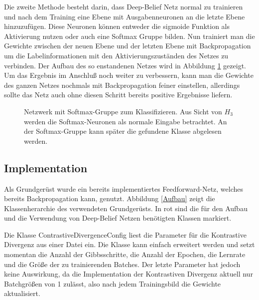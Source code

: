 \documentclass[12pt]{article}
\begin{document}
Die zweite Methode besteht darin, dass Deep-Belief Netz normal zu trainieren und nach dem Training eine Ebene mit Ausgabenneuronen an die letzte Ebene hinzuzufügen. Diese Neuronen können entweder die sigmoide Funktion als Aktivierung nutzen oder auch eine Softmax Gruppe bilden. Nun trainiert man die Gewichte zwischen der neuen Ebene und der letzten Ebene mit Backpropagation um die Labelinformationen mit den Aktivierungszuständen des Netzes zu verbinden. Der Aufbau des so enstandenen Netzes wird in Abbildung \ref{BPTrain} gezeigt. Um das Ergebnis im Anschluß noch weiter zu verbessern, kann man die Gewichte des ganzen Netzes nochmals mit Backpropagation feiner einstellen, allerdings sollte das Netz auch ohne diesen Schritt bereits positive Ergebnisse liefern\cite{backprop}.

\begin{figure}[H]
	\center
	
	\caption{Netzwerk mit Softmax-Gruppe zum Klassifizieren. Aus Sicht von $H_3$ werden die Softmax-Neuronen als normale Eingabe betrachtet. An der Softmax-Gruppe kann später die gefundene Klasse abgelesen werden.}
	\label{BPTrain}
\end{figure}


\subsection{Implementation}
Als Grundgerüst wurde ein bereits implementiertes Feedforward-Netz, welches bereits Backpropagation kann, genutzt. Abbildung \ref{Aufbau} zeigt die Klassenherarchie des verwendeten Grundgerüsts. In rot sind die für den Aufbau und die Verwendung von Deep-Belief Netzen benötigten Klassen markiert.

Die Klasse ContrastiveDivergenceConfig liest die Parameter für die Kontrastive Divergenz aus einer Datei ein. Die Klasse kann einfach erweitert werden und setzt momentan die Anzahl der Gibbsschritte, die Anzahl der Epochen, die Lernrate und die Größe der zu trainierenden Batches. Der letzte Parameter hat jedoch keine Auswirkung, da die Implementation der Kontrastiven Divergenz aktuell nur Batchgrößen von 1 zulässt, also nach jedem Trainingsbild die Gewichte aktualisiert.
\end{document}
